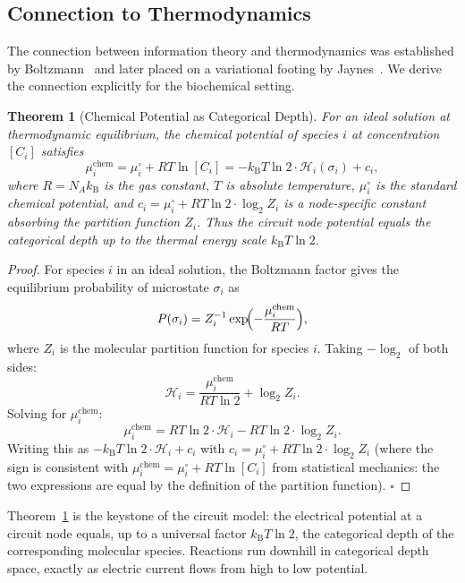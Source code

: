 \documentclass[twocolumn,10pt,a4paper]{article}
\newcommand{\kB}{k_{\mathrm{B}}}
\newcommand{\Hcat}{\mathcal{H}}
\newtheorem{theorem}{Theorem}[section]
\begin{document}
\subsection{Connection to Thermodynamics}
\label{sec:info-thermo}

The connection between information theory and thermodynamics was established by
Boltzmann~\cite{Boltzmann1877} and later placed on a variational footing by
Jaynes~\cite{Jaynes1957}.  We derive the connection explicitly for the
biochemical setting.

\begin{theorem}[Chemical Potential as Categorical Depth]
\label{thm:mu-catdepth}
For an ideal solution at thermodynamic equilibrium, the chemical potential of
species $i$ at concentration $[C_i]$ satisfies
\begin{equation}
  \mu_i^{\mathrm{chem}} = \mu_i^\circ + RT\ln[C_i]
    = -\kB T\ln 2\cdot\Hcat_i(\sigma_i) + c_i,
  \label{eq:mu-catdepth}
\end{equation}
where $R=N_A\kB$ is the gas constant, $T$ is absolute temperature, $\mu_i^\circ$
is the standard chemical potential, and
$c_i = \mu_i^\circ + RT\ln 2\cdot\log_2 Z_i$ is a node-specific constant
absorbing the partition function $Z_i$.  Thus the circuit node potential equals
the categorical depth up to the thermal energy scale $\kB T\ln 2$.
\end{theorem}

\begin{proof}
For species $i$ in an ideal solution, the Boltzmann factor gives the
equilibrium probability of microstate $\sigma_i$
as~\cite{NichollsFerguson2002,Gibbs1875}
\[
  P(\sigma_i) = Z_i^{-1}\exp\!\Bigl(-\frac{\mu_i^{\mathrm{chem}}}{RT}\Bigr),
\]
where $Z_i$ is the molecular partition function for species $i$.  Taking
$-\log_2$ of both sides:
\[
  \Hcat_i = \frac{\mu_i^{\mathrm{chem}}}{RT\ln 2} + \log_2 Z_i.
\]
Solving for $\mu_i^{\mathrm{chem}}$:
\[
  \mu_i^{\mathrm{chem}} = RT\ln 2\cdot\Hcat_i - RT\ln 2\cdot\log_2 Z_i.
\]
Writing this as $-\kB T\ln 2\cdot\Hcat_i + c_i$ with
$c_i = \mu_i^\circ + RT\ln 2\cdot\log_2 Z_i$ (where the sign is consistent
with $\mu_i^{\mathrm{chem}} = \mu_i^\circ + RT\ln[C_i]$ from statistical
mechanics: the two expressions are equal by the definition of the partition
function).  $\square$
\end{proof}

Theorem~\ref{thm:mu-catdepth} is the keystone of the circuit model: the
electrical potential at a circuit node equals, up to a universal factor
$\kB T\ln 2$, the categorical depth of the corresponding molecular species.
Reactions run downhill in categorical depth space, exactly as electric current
flows from high to low potential.
\end{document}
